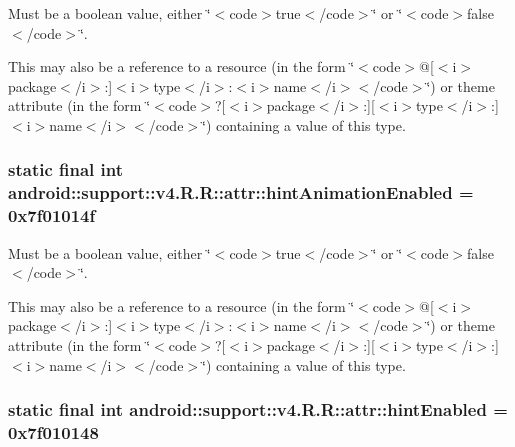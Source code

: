 Must be a boolean value, either \char`\"{}$<$code$>$true$<$/code$>$\char`\"{} or \char`\"{}$<$code$>$false$<$/code$>$\char`\"{}. 

This may also be a reference to a resource (in the form \char`\"{}$<$code$>$@\mbox{[}$<$i$>$package$<$/i$>$:\mbox{]}$<$i$>$type$<$/i$>$:$<$i$>$name$<$/i$>$$<$/code$>$\char`\"{}) or theme attribute (in the form \char`\"{}$<$code$>$?\mbox{[}$<$i$>$package$<$/i$>$:\mbox{]}\mbox{[}$<$i$>$type$<$/i$>$:\mbox{]}$<$i$>$name$<$/i$>$$<$/code$>$\char`\"{}) containing a value of this type. \hypertarget{classandroid_1_1support_1_1v4_1_1_r_1_1attr_1d796d726b048380f046578fbb3431b7}{
\subsubsection[{hintAnimationEnabled}]{\setlength{\rightskip}{0pt plus 5cm}static final int android::support::v4.R.R::attr::hintAnimationEnabled = 0x7f01014f}}
\label{classandroid_1_1support_1_1v4_1_1_r_1_1attr_1d796d726b048380f046578fbb3431b7}


Must be a boolean value, either \char`\"{}$<$code$>$true$<$/code$>$\char`\"{} or \char`\"{}$<$code$>$false$<$/code$>$\char`\"{}. 

This may also be a reference to a resource (in the form \char`\"{}$<$code$>$@\mbox{[}$<$i$>$package$<$/i$>$:\mbox{]}$<$i$>$type$<$/i$>$:$<$i$>$name$<$/i$>$$<$/code$>$\char`\"{}) or theme attribute (in the form \char`\"{}$<$code$>$?\mbox{[}$<$i$>$package$<$/i$>$:\mbox{]}\mbox{[}$<$i$>$type$<$/i$>$:\mbox{]}$<$i$>$name$<$/i$>$$<$/code$>$\char`\"{}) containing a value of this type. \hypertarget{classandroid_1_1support_1_1v4_1_1_r_1_1attr_bc2d3e45dfbd47790632aa0e094a3326}{
\subsubsection[{hintEnabled}]{\setlength{\rightskip}{0pt plus 5cm}static final int android::support::v4.R.R::attr::hintEnabled = 0x7f010148}}
\label{classandroid_1_1support_1_1v4_1_1_r_1_1attr_bc2d3e45dfbd47790632aa0e094a3326}


